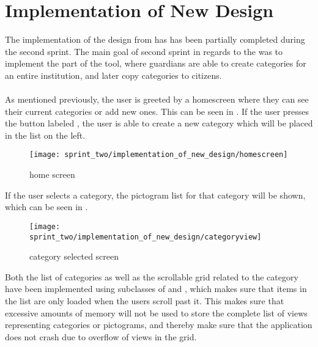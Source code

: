 \section{Implementation of New Design}
\label{sec:implementation_of_new_design}

The implementation of the design from  has has been partially completed during the second sprint. The main goal of second sprint in regards to the \ct was to implement the part of the tool, where guardians are able to create categories for an entire institution, and later copy categories to citizens.
\\\\
As mentioned previously, the user is greeted by a homescreen where they can see their current categories or add new ones. This can be seen in . If the user presses the button labeled , the user is able to create a new category which will be placed in the list on the left. 

\begin{figure}[!htbp]
    \centering
    \texttt{[image: sprint\_two/implementation\_of\_new\_design/homescreen]}
    \caption{\ct home screen}
    \label{fig:ct_home_screen}
\end{figure}

If the user selects a category, the pictogram list for that category will be shown, which can be seen in .\\

\begin{figure}[!htbp]
    \centering
    \texttt{[image: sprint\_two/implementation\_of\_new\_design/categoryview]}
    \caption{\ct category selected screen}
    \label{fig:ct_category_view}
\end{figure}

Both the list of categories as well as the scrollable grid related to the category have been implemented using subclasses of  and , which makes sure that items in the list are only loaded when the users scroll past it. This makes sure that excessive amounts of memory will not be used to store the complete list of views representing categories or pictograms, and thereby make sure that the application does not crash due to overflow of views in the grid.